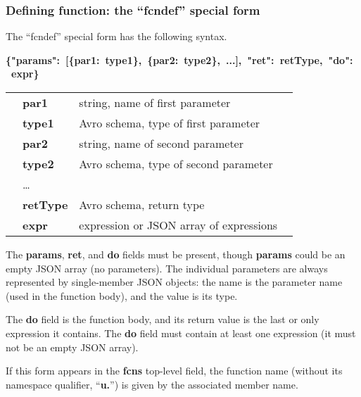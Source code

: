 \documentclass{article}
\newcommand{\PFAc}{\ttfamily\bfseries}
\theoremstyle{definition}
\begin{document}
\subsubsection{Defining function: the ``fcndef'' special form}

\hypertarget{hsec:fcndef}{}
\label{form:fcndef}
\begin{minipage}{\linewidth}
The ``fcndef'' special form has the following syntax.
\begin{center}
\begin{minipage}{0.9\linewidth}
\mbox{\PFAc \{"params":$\!$ [\{par1:$\!$ type1\}, \{par2:$\!$ type2\}, ...], "ret":$\!$ retType, "do":$\!$ expr\} \vspace{0.2 cm} \\} \vspace{0.2 cm} \\
\rm \begin{tabular}{p{0.01\linewidth} l p{0.8\linewidth}}
& \PFAc par1 \rm & string, name of first parameter \\
& \PFAc type1 \rm & Avro schema, type of first parameter \\
& \PFAc par2 \rm & string, name of second parameter \\
& \PFAc type2 \rm & Avro schema, type of second parameter \\
& \ldots & \\
& \PFAc retType \rm & Avro schema, return type \\
& \PFAc expr \rm & expression or JSON array of expressions \\
\end{tabular}
\end{minipage}
\end{center}
\end{minipage}

The {\PFAc params}, {\PFAc ret}, and {\PFAc do} fields must be present, though {\PFAc params} could be an empty JSON array (no parameters).  The individual parameters are always represented by single-member JSON objects: the name is the parameter name (used in the function body), and the value is its type.

The {\PFAc do} field is the function body, and its return value is the last or only expression it contains.  The {\PFAc do} field must contain at least one expression (it must not be an empty JSON array).

If this form appears in the {\PFAc fcns} top-level field, the function name (without its namespace qualifier, ``{\PFAc u.}'') is given by the associated member name.
\end{document}
